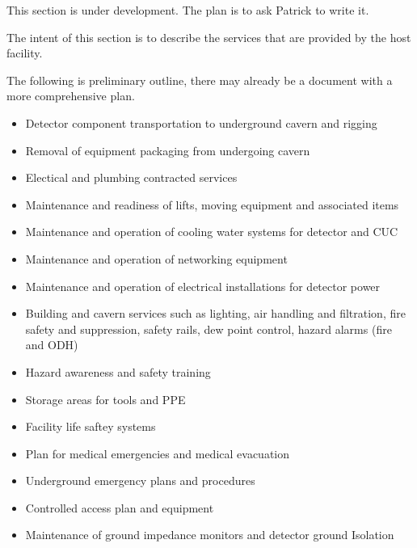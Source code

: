 This section is under development. The plan is to ask Patrick to write
it.

The intent of this section is to describe the services that are
provided by the host facility.

The following is preliminary outline, there may already be a document
with a more comprehensive plan.
\begin{itemize}
\item Detector component transportation to underground cavern and rigging
\item Removal of equipment packaging from undergoing cavern
\item Electical and plumbing contracted services
\item Maintenance and readiness of lifts, moving equipment and associated items
\item Maintenance and operation of cooling water systems for detector and CUC
\item Maintenance and operation of networking equipment
\item Maintenance and operation of electrical installations for detector power
\item Building and cavern services such as lighting, air handling and
  filtration, fire safety and suppression, safety rails, dew point
  control, hazard alarms (fire and ODH)
\item Hazard awareness and safety training
\item Storage areas for tools and PPE
\item Facility life saftey systems
\item Plan for medical emergencies and medical evacuation
\item Underground emergency plans and procedures
\item Controlled access plan and equipment
\item Maintenance of ground impedance monitors and detector ground Isolation
\end{itemize}


